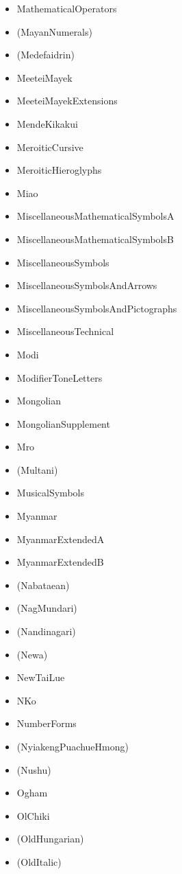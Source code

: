 \documentclass{article}
\newenvironment{itemlist}{%
  \begin{itemize}
  \setlength{\itemsep}{0pt}
  \setlength{\parsep}{0pt}
  \setlength{\topsep}{0pt}
  \setlength{\partopsep}{0pt}
  \setlength{\parskip}{0pt}
  \setlength{\labelsep}{5pt}}%
{
  \end{itemize}}
\begin{document}
\begin{multicols*}{2}
\begin{itemlist}
        \item MathematicalOperators
        \item (MayanNumerals)
        \item (Medefaidrin)
        \item MeeteiMayek
        \item MeeteiMayekExtensions
        \item MendeKikakui
        \item MeroiticCursive
        \item MeroiticHieroglyphs
        \item Miao
        \item MiscellaneousMathematicalSymbolsA
        \item MiscellaneousMathematicalSymbolsB
        \item MiscellaneousSymbols
        \item MiscellaneousSymbolsAndArrows
        \item MiscellaneousSymbolsAndPictographs
        \item MiscellaneousTechnical
        \item Modi
        \item ModifierToneLetters
        \item Mongolian
        \item MongolianSupplement
        \item Mro
        \item (Multani)
        \item MusicalSymbols
        \item Myanmar
        \item MyanmarExtendedA
        \item MyanmarExtendedB
        \item (Nabataean)
        \item (NagMundari)
        \item (Nandinagari)
        \item (Newa)
        \item NewTaiLue
        \item NKo
        \item NumberForms
        \item (NyiakengPuachueHmong)
        \item (Nushu)
        \item Ogham
        \item OlChiki
        \item (OldHungarian)
        \item (OldItalic)

\end{itemlist}
\end{multicols*}
\end{document}

